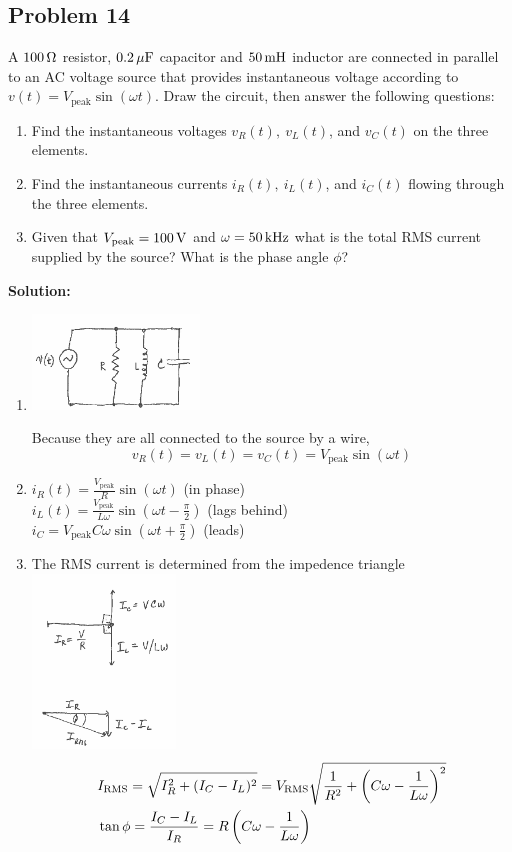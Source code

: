 \subsection*{Problem 14}
A $100\,\mathrm{\Omega}$ resistor, $0.2\,\mathrm{\mu F}$ capacitor and $50\,\mathrm{mH}$ inductor are connected in parallel to an AC voltage source that provides instantaneous voltage according to $v(t)=V_\text{peak}\sin(\omega t)$. Draw the circuit, then answer the following questions:
\begin{enumerate}
    \item Find the instantaneous voltages $v_R(t),\ v_L(t)$, and $v_C(t)$ on the three elements.
    \item Find the instantaneous currents $i_R(t),\ i_L(t)$, and $i_C(t)$ flowing through the three elements.
    \item Given that $V_\text{peak}=100\,\mathrm{V}$ and $\omega=50\,\mathrm{kHz}$ what is the total RMS current supplied by the source? What is the phase angle $\phi$?
\end{enumerate}

\textbf{Solution:}
\begin{enumerate}
    \item \centerline{\includegraphics[width=0.35\textwidth]{Images/P14img1.png}}
    Because they are all connected to the source by a wire,
    \[v_R(t)=v_L(t)=v_C(t)=V_\text{peak}\sin(\omega t)\]
    \item $i_R(t)=\frac{V_\text{peak}}{R}\sin(\omega t)$ (in phase)\\
    $i_L(t)=\frac{V_\text{peak}}{L\omega}\sin(\omega t-\frac{\pi}{2})$ (lags behind)\\
    $i_C=V_\text{peak}C\omega\sin(\omega t+\frac{\pi}{2})$ (leads)
    \item The RMS current is determined from the impedence triangle\\
    \includegraphics[width=0.3\textwidth]{Images/P14img2.png}
    \begin{align*}
        &I_\text{RMS}=\sqrt{I_R^2+(I_C-I_L)^2}=V_\text{RMS}\sqrt{\frac{1}{R^2}+\left( C\omega-\frac{1}{L\omega} \right)^2}\\
        &\tan\phi=\frac{I_C-I_L}{I_R}=R\left( C\omega-\frac{1}{L\omega} \right)
    \end{align*}
\end{enumerate}